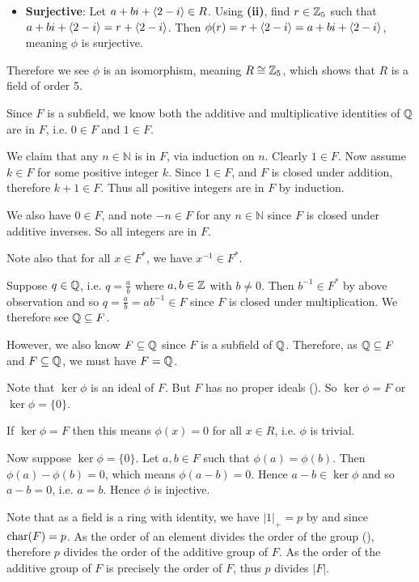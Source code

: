 \begin{questions}
\begin{partquestions}{\roman*}
\begin{itemize}
            \item \textbf{Surjective}: Let $a+bi + \left\langle2-i\right\rangle \in R$. Using \textbf{(ii)}, find $r \in \mathbb{Z}_5$ such that $a+bi + \left\langle2-i\right\rangle = r + \left\langle2-i\right\rangle$. Then $\phi(r) = r + \left\langle2-i\right\rangle = a+bi + \left\langle2-i\right\rangle$, meaning $\phi$ is surjective.
        \end{itemize}
        Therefore we see $\phi$ is an isomorphism, meaning $R \cong \mathbb{Z}_5$, which shows that $R$ is a field of order 5.
    \end{partquestions}

    \item Since $F$ is a subfield, we know both the additive and multiplicative identities of $\mathbb{Q}$ are in $F$, i.e. $0 \in F$ and $1 \in F$.

    We claim that any $n \in \mathbb{N}$ is in $F$, via induction on $n$. Clearly $1 \in F$. Now assume $k \in F$ for some positive integer $k$. Since $1 \in F$, and $F$ is closed under addition, therefore $k + 1 \in F$. Thus all positive integers are in $F$ by induction.

    We also have $0 \in F$, and note $-n \in F$ for any $n \in \mathbb{N}$ since $F$ is closed under additive inverses. So all integers are in $F$.

    Note also that for all $x \in F^\ast$, we have $x^{-1} \in F^\ast$.

    Suppose $q \in \mathbb{Q}$, i.e. $q = \frac ab$ where $a, b \in \mathbb{Z}$ with $b \neq 0$. Then $b^{-1} \in F^\ast$ by above observation and so $q = \frac ab = ab^{-1} \in F$ since $F$ is closed under multiplication. We therefore see $\mathbb{Q} \subseteq F$.

    However, we also know $F \subseteq \mathbb{Q}$ since $F$ is a subfield of $\mathbb{Q}$. Therefore, as $\mathbb{Q} \subseteq F$ and $F \subseteq \mathbb{Q}$, we must have $F = \mathbb{Q}$.

    \item Note that $\ker\phi$ is an ideal of $F$. But $F$ has no proper ideals (). So $\ker\phi = F$ or $\ker\phi = \{0\}$.

    If $\ker\phi = F$ then this means $\phi(x) = 0$ for all $x\in R$, i.e. $\phi$ is trivial.

    Now suppose $\ker\phi = \{0\}$. Let $a, b \in F$ such that $\phi(a) = \phi(b)$. Then $\phi(a) - \phi(b) = 0$, which means $\phi(a - b) = 0$. Hence $a - b \in \ker\phi$ and so $a - b = 0$, i.e. $a = b$. Hence $\phi$ is injective.

    \item \begin{partquestions}{\roman*}
        \item Note that as a field is a ring with identity, we have $|1|_+ = p$ by  and since $\mathrm{char}(F) = p$. As the order of an element divides the order of the group (), therefore $p$ divides the order of the additive group of $F$. As the order of the additive group of $F$ is precisely the order of $F$, thus $p$ divides $|F|$.


\end{partquestions}
\end{questions}
